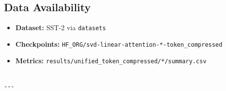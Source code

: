 \subsection{Data Availability}

\begin{itemize}
\item \textbf{Dataset:} SST-2 via \texttt{datasets}
\item \textbf{Checkpoints:} \texttt{{{HF\_ORG}}/svd-linear-attention-*-token\_compressed}
\item \textbf{Metrics:} \texttt{results/unified\_token\_compressed/*/summary.csv}
\end{itemize}
\begin{lstlisting}

---
\end{lstlisting}